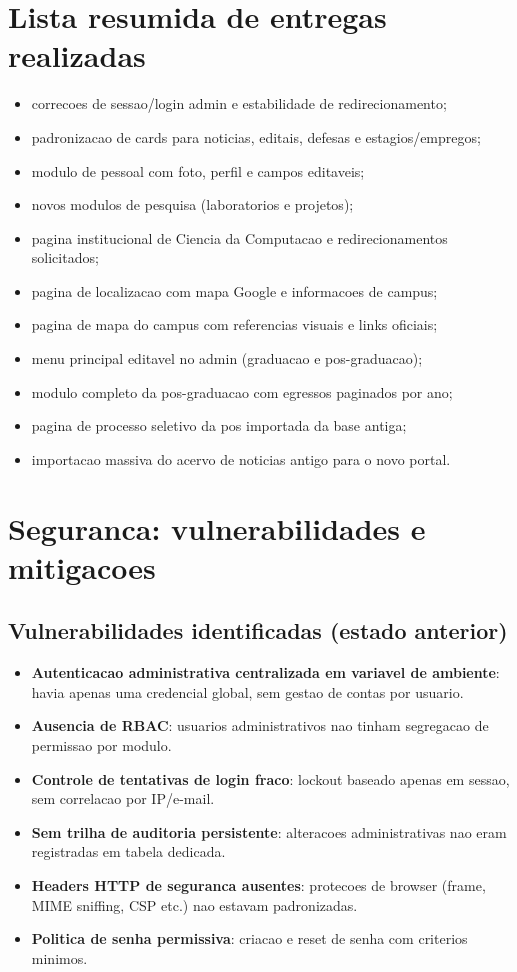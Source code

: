 \documentclass[12pt,a4paper]{article}
\begin{document}
\section{Lista resumida de entregas realizadas}
\begin{itemize}
    \item correcoes de sessao/login admin e estabilidade de redirecionamento;
    \item padronizacao de cards para noticias, editais, defesas e estagios/empregos;
    \item modulo de pessoal com foto, perfil e campos editaveis;
    \item novos modulos de pesquisa (laboratorios e projetos);
    \item pagina institucional de Ciencia da Computacao e redirecionamentos solicitados;
    \item pagina de localizacao com mapa Google e informacoes de campus;
    \item pagina de mapa do campus com referencias visuais e links oficiais;
    \item menu principal editavel no admin (graduacao e pos-graduacao);
    \item modulo completo da pos-graduacao com egressos paginados por ano;
    \item pagina de processo seletivo da pos importada da base antiga;
    \item importacao massiva do acervo de noticias antigo para o novo portal.
\end{itemize}

\section{Seguranca: vulnerabilidades e mitigacoes}
\subsection{Vulnerabilidades identificadas (estado anterior)}
\begin{itemize}
    \item \textbf{Autenticacao administrativa centralizada em variavel de ambiente}: havia apenas uma credencial global, sem gestao de contas por usuario.
    \item \textbf{Ausencia de RBAC}: usuarios administrativos nao tinham segregacao de permissao por modulo.
    \item \textbf{Controle de tentativas de login fraco}: lockout baseado apenas em sessao, sem correlacao por IP/e-mail.
    \item \textbf{Sem trilha de auditoria persistente}: alteracoes administrativas nao eram registradas em tabela dedicada.
    \item \textbf{Headers HTTP de seguranca ausentes}: protecoes de browser (frame, MIME sniffing, CSP etc.) nao estavam padronizadas.
    \item \textbf{Politica de senha permissiva}: criacao e reset de senha com criterios minimos.
\end{itemize}
\end{document}

